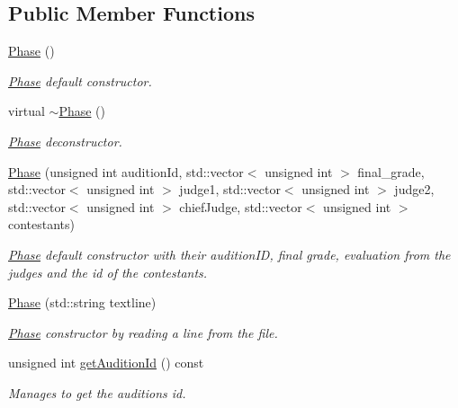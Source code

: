 \subsection*{Public Member Functions}
\begin{DoxyCompactItemize}
\item 
\mbox{\label{class_phase_a3760262f782f336aa55c1f14266fc455}} 
\hyperlink{class_phase_a3760262f782f336aa55c1f14266fc455}{Phase} ()
\begin{DoxyCompactList}\small\item\em \hyperlink{class_phase}{Phase} default constructor. \end{DoxyCompactList}\item 
\mbox{\label{class_phase_ad66fc793040c3e37c2c3e954edfc627d}} 
virtual \hyperlink{class_phase_ad66fc793040c3e37c2c3e954edfc627d}{$\sim$\+Phase} ()
\begin{DoxyCompactList}\small\item\em \hyperlink{class_phase}{Phase} deconstructor. \end{DoxyCompactList}\item 
\hyperlink{class_phase_a19be92bd99171dcd6f202aa414941df8}{Phase} (unsigned int audition\+Id, std\+::vector$<$ unsigned int $>$ final\+\_\+grade, std\+::vector$<$ unsigned int $>$ judge1, std\+::vector$<$ unsigned int $>$ judge2, std\+::vector$<$ unsigned int $>$ chief\+Judge, std\+::vector$<$ unsigned int $>$ contestants)
\begin{DoxyCompactList}\small\item\em \hyperlink{class_phase}{Phase} default constructor with their audition\+ID, final grade, evaluation from the judges and the id of the contestants. \end{DoxyCompactList}\item 
\hyperlink{class_phase_ad0e5ebffc33f2127e147b0330e72efd5}{Phase} (std\+::string textline)
\begin{DoxyCompactList}\small\item\em \hyperlink{class_phase}{Phase} constructor by reading a line from the file. \end{DoxyCompactList}\item 
unsigned int \hyperlink{class_phase_a7d5b0ced6ad5d523cace56f9122b0af2}{get\+Audition\+Id} () const
\begin{DoxyCompactList}\small\item\em Manages to get the audition\textquotesingle{}s id. \end{DoxyCompactList}\item 

\end{DoxyCompactItemize}
